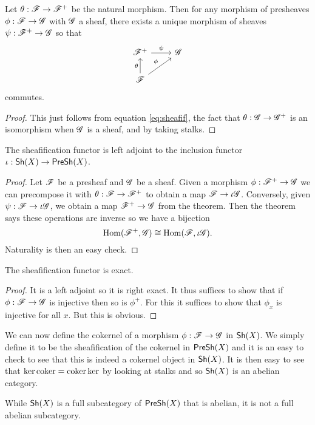 \documentclass{memoir}
\begin{document}
\begin{thm}
    Let $\theta:\mathscr{F}\to\mathscr{F}^+$ be the natural morphism. 
    Then for any morphism of presheaves $\phi:\mathscr{F}\to \mathscr{G}$ with $\mathscr{G}$ a sheaf, there exists a unique morphism of sheaves $\psi:\mathscr{F}^+\to\mathscr{G}$ so that 
    \begin{equation}
        \begin{tikzcd}
            \shf{F}^+ \arrow[r,"\psi"] & \shf{G} \\
            \shf{F} \arrow[ur,"\phi"] \arrow[u,"\theta"]
        \end{tikzcd}
    \end{equation}
    commutes.
\end{thm}
\begin{proof}
    This just follows from equation \ref{eq:sheafif}, the fact that $\theta:\mathscr{G}\to\mathscr{G}^+$ is an isomorphism when $\mathscr{G}$ is a sheaf, and by taking stalks.
\end{proof}
\begin{corollary}
    The sheafification functor is left adjoint to the inclusion functor $\iota:{\normalfont\mathsf{Sh}}(X)\to{\normalfont\mathsf{PreSh}}(X)$.
\end{corollary}
\begin{proof}
    Let $\mathscr{F}$ be a presheaf and $\mathscr{G}$ be a sheaf.
    Given a morphism $\phi:\mathscr{F}^+\to\mathscr{G}$ we can precompose it with $\theta:\mathscr{F}\to\mathscr{F}^+$ to obtain a map $\mathscr{F}\to\iota\mathscr{G}$.
    Conversely, given $\psi:\mathscr{F}\to\iota\mathscr{G}$, we obtain a map $\mathscr{F}^+\to \mathscr{G}$ from the theorem.
    Then the theorem says these operations are inverse so we have a bijection 
    \begin{equation}
        \operatorname{Hom}(\mathscr{F}^+,\mathscr{G}) \cong \operatorname{Hom}(\mathscr{F},\iota\mathscr{G}).
    \end{equation}
    Naturality is then an easy check.
\end{proof}
\begin{corollary}
    The sheafification functor is exact.
\end{corollary}
\begin{proof}
    It is a left adjoint so it is right exact.
    It thus suffices to show that if $\phi:\mathscr{F}\to\mathscr{G}$ is injective then so is $\phi^+$.
    For this it suffices to show that $\phi_x$ is injective for all $x$.
    But this is obvious.
\end{proof}
We can now define the cokernel of a morphism $\phi:\mathscr{F}\to\mathscr{G}$ in ${\normalfont\mathsf{Sh}}(X)$.
We simply define it to be the sheafification of the cokernel in ${\normalfont\mathsf{PreSh}}(X)$ and it is an easy to check to see that this is indeed a cokernel object in ${\normalfont\mathsf{Sh}}(X)$.
It is then easy to see that $\ker\operatorname{coker} = \operatorname{coker}\ker$ by looking at stalks and so ${\normalfont\mathsf{Sh}}(X)$ is an abelian category.
\begin{remark}
    While ${\normalfont\mathsf{Sh}}(X)$ is a full subcategory of ${\normalfont\mathsf{PreSh}}(X)$ that is abelian, it is not a full abelian subcategory.
\end{remark}
\end{document}
